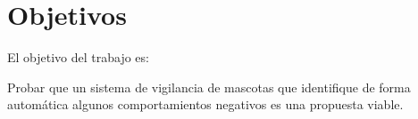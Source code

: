 \section{Objetivos}

El objetivo del trabajo es:

\begin{quotebox}
  Probar que un sistema de vigilancia de mascotas que identifique de forma automática algunos comportamientos negativos es una propuesta viable.
\end{quotebox}





